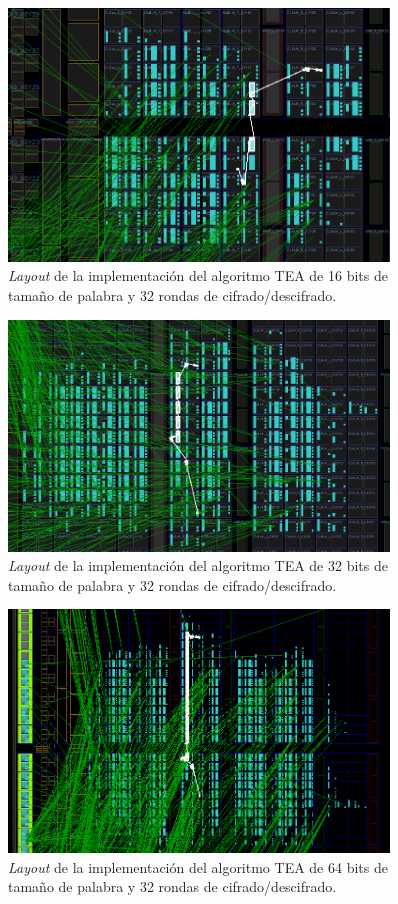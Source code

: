 \begin{figure}[H]
	\centering
	\includegraphics[width=0.9\textwidth]{./images/fig16_32_layout}
	\caption{\textit{Layout} de la implementación del algoritmo TEA de 16 bits de tamaño de palabra y 32 rondas de cifrado/descifrado.}
	\label{fig16_32_layout}
\end{figure}

\begin{figure}[H]
	\centering
	\includegraphics[width=0.9\textwidth]{./images/fig32_32_layout}
	\caption{\textit{Layout} de la implementación del algoritmo TEA de 32 bits de tamaño de palabra y 32 rondas de cifrado/descifrado.}
	\label{fig32_32_layout}
\end{figure}

\begin{figure}[H]
	\centering
	\includegraphics[width=0.9\textwidth]{./images/fig64_32_layout}
	\caption{\textit{Layout} de la implementación del algoritmo TEA de 64 bits de tamaño de palabra y 32 rondas de cifrado/descifrado.}
	\label{fig64_32_layout}
\end{figure}

